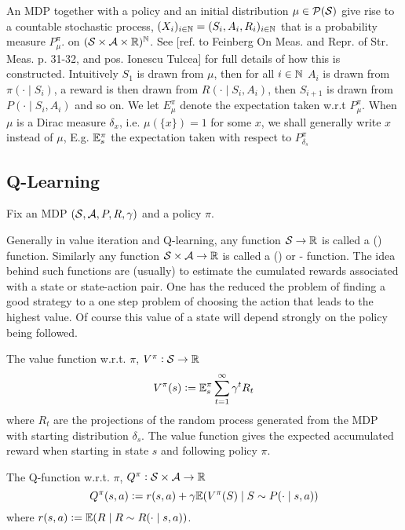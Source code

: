 An MDP together with a policy and an initial distribution
$\mu \in \mathcal{P}(\mathcal{S})$
give rise to a countable stochastic process,
$ (X_i)_{i\in \mathbb{N}} = (S_i, A_i, R_i)_{i\in \mathbb{N}}$ 
that is a probability measure $P^\pi_\mu$. on
$(\mathcal{S} \times \mathcal{A} \times \mathbb{R})^\mathbb{N} $.
See [ref. to Feinberg On Meas. and Repr. of Str. Meas. p. 31-32,
and pos. Ionescu Tulcea] %
for full details of how this is constructed.
Intuitively $S_1$ is drawn from $\mu$,
then for all $i \in \mathbb{N}$
$A_i$ is drawn from $\pi(\cdot \mid S_i)$,
a reward is then drawn from $R(\cdot \mid S_i, A_i)$,
then $S_{i+1}$ is drawn from $P(\cdot \mid S_i, A_i)$ and so on.
We let $E^\pi_\mu$ denote the expectation taken w.r.t $P^\pi_\mu$.
When $\mu$ is a Dirac measure $\delta_x$, i.e. $\mu(\{x\}) = 1$ for some $x$,
we shall generally write $x$ instead of $\mu$,
E.g. $\mathbb{E}^\pi_s$ the expectation taken with respect to $P^\pi_{\delta_s}$

\subsection{Q-Learning}

Fix an MDP $(\mathcal{S}, \mathcal{A}, P, R, \gamma)$ and a policy $\pi$.

Generally in value iteration and Q-learning,
any function $\mathcal{S} \to \mathbb{R}$ is called a ()
 function. Similarly any function
$\mathcal{S} \times \mathcal{A} \to \mathbb{R}$ is called a ()
 or - function.
The idea behind such functions are (usually) to estimate the cumulated
rewards associated with a state or state-action pair.
One has the reduced the problem of finding a good strategy
to a one step problem of choosing the action that leads to the
highest value. Of course this value of a state will depend
strongly on the policy being followed. 

The  value function
w.r.t. $\pi$,
$V^\pi : \mathcal{S} \to \mathbb{R}$
\[ V^\pi(s) \vcentcolon= \mathbb{E}^\pi_s \sum_{t = 1}^\infty \gamma^t R_t \]
where $R_t$ are the projections of the random process generated from the
MDP with starting distribution $\delta_s$. The value function gives the expected 
accumulated reward when starting in state $s$ and following policy $\pi$.

The  Q-function 
w.r.t. $\pi$,
$Q^\pi : \mathcal{S} \times \mathcal{A} \to \mathbb{R}$
\[ Q^\pi(s, a) \vcentcolon= r(s, a) +
\gamma \mathbb{E} (V^\pi(S) \mid S \sim P(\cdot \mid s, a)) \]
where $r(s,a) \vcentcolon= \mathbb{E}(R \mid R \sim R(\cdot \mid s, a))$.

